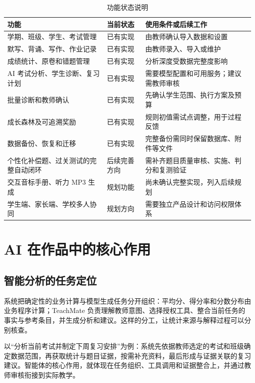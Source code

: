\documentclass[11pt,a4paper,fontset=none]{ctexart}
\begin{document}
\begin{table}[htbp]
\centering
\small
\begin{tabularx}{\textwidth}{@{}L{4.6cm}L{2.2cm}Y@{}}
\toprule
\textbf{功能} & \textbf{当前状态} & \textbf{使用条件或后续工作} \\
\midrule
学期、班级、学生、考试管理 & 已有实现 & 由教师确认导入数据和设置 \\
默写、背诵、写作、作业记录 & 已有实现 & 由教师录入、导入或维护 \\
成绩统计、原卷和错题管理 & 已有实现 & 分析深度受数据完整度影响 \\
AI 考试分析、学生诊断、复习计划 & 已有实现 & 需要模型配置和可用服务；建议需教师审核 \\
批量诊断和教师确认 & 已有实现 & 先确认学生范围、执行方案及预算 \\
成长森林及可追溯奖励 & 已有实现 & 规则初值需试点调整，用于过程反馈 \\
数据备份、恢复和迁移 & 已有实现 & 完整备份需同时保留数据库、附件等文件 \\
个性化补偿题、过关测试的完整自动闭环 & 后续完善方向 & 需补齐题目质量审核、实施、判分和复测验证 \\
交互音标手册、听力 MP3 生成 & 规划功能 & 尚未确认完整实现，列入后续规划 \\
学生端、家长端、学校多人协同 & 规划方向 & 需要独立产品设计和访问权限体系 \\
\bottomrule
\end{tabularx}
\caption{功能状态说明}
\end{table}

\section{AI 在作品中的核心作用}

\subsection{智能分析的任务定位}

系统把确定性的业务计算与模型生成任务分开组织：平均分、得分率和分数分布由业务程序计算；TeachMate 负责理解教师意图、选择授权工具、整合当前任务的事实与参考条目，并生成分析和建议。这样的分工，让统计来源与解释过程可以分别核查。

以“分析当前考试并制定下周复习安排”为例：系统先依据教师选定的考试和班级确定数据范围，再获取统计与题目证据，按需补充资料，最后形成与证据关联的复习建议。智能体的核心作用，就体现在任务组织、工具调用和证据整合上，并通过教师审核衔接到实际教学。
\end{document}
